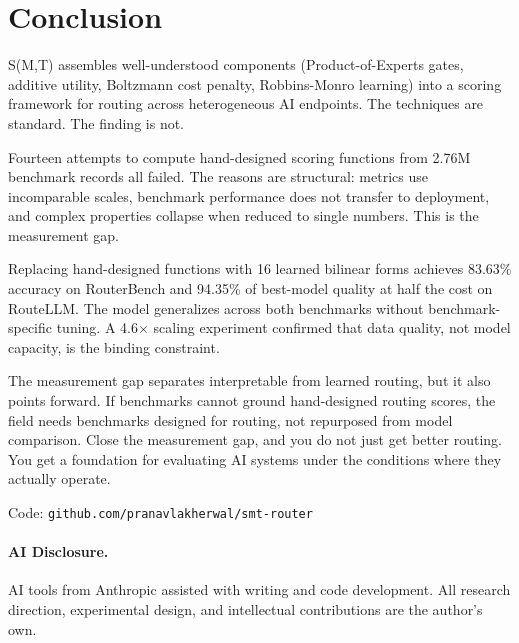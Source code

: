 \section{Conclusion}
\label{sec:conclusion}

S(M,T) assembles well-understood components (Product-of-Experts gates, additive utility, Boltzmann cost penalty, Robbins-Monro learning) into a scoring framework for routing across heterogeneous AI endpoints. The techniques are standard. The finding is not.

Fourteen attempts to compute hand-designed scoring functions from 2.76M benchmark records all failed. The reasons are structural: metrics use incomparable scales, benchmark performance does not transfer to deployment, and complex properties collapse when reduced to single numbers. This is the measurement gap.

Replacing hand-designed functions with 16 learned bilinear forms achieves 83.63\% accuracy on RouterBench and 94.35\% of best-model quality at half the cost on RouteLLM. The model generalizes across both benchmarks without benchmark-specific tuning. A 4.6$\times$ scaling experiment confirmed that data quality, not model capacity, is the binding constraint.

The measurement gap separates interpretable from learned routing, but it also points forward. If benchmarks cannot ground hand-designed routing scores, the field needs benchmarks designed for routing, not repurposed from model comparison. Close the measurement gap, and you do not just get better routing. You get a foundation for evaluating AI systems under the conditions where they actually operate.

Code: \texttt{github.com/pranavlakherwal/smt-router}

\paragraph{AI Disclosure.} AI tools from Anthropic assisted with writing and code development. All research direction, experimental design, and intellectual contributions are the author's own.
